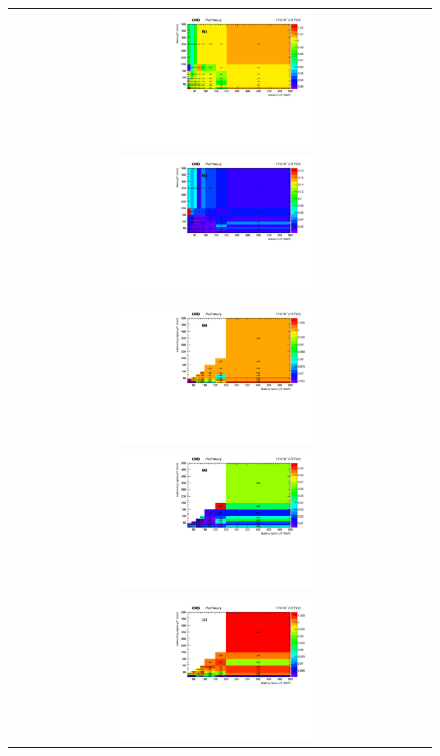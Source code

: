 \begin{figure}[h]
  \begin{center}
    \begin{tabular}{cc}
      \includegraphics[width=0.50\textwidth]{fig_2016postVFP_TrigSF/h2D_lepABpt_emu.pdf}
      \includegraphics[width=0.50\textwidth]{fig_2016postVFP_TrigSF/h2D_lepABpt_emu_BinErrors.pdf}\\       
      \includegraphics[width=0.50\textwidth]{fig_2016postVFP_TrigSF/h2D_lepABpt_ee.pdf}
      \includegraphics[width=0.50\textwidth]{fig_2016postVFP_TrigSF/h2D_lepABpt_ee_BinErrors.pdf}\\
      \includegraphics[width=0.50\textwidth]{fig_2016postVFP_TrigSF/h2D_lepABpt_mumu.pdf}

\end{tabular}
\end{center}
\end{figure}
